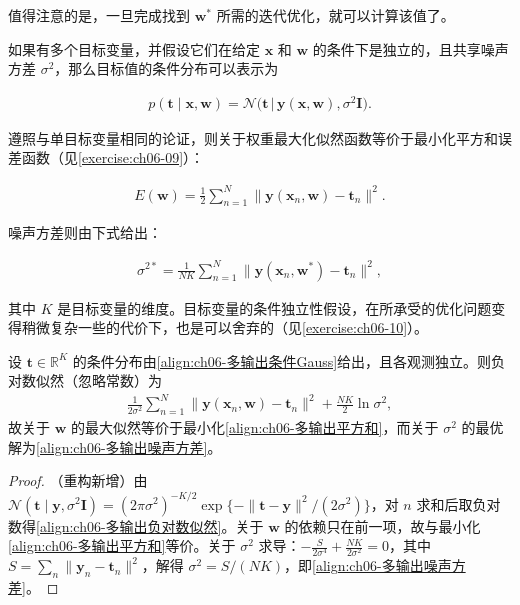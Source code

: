 \documentclass[../../main.tex]{subfiles}
\begin{document}
值得注意的是，一旦完成找到 $\boldsymbol{w}^{\ast}$ 所需的迭代优化，就可以计算该值了。

如果有多个目标变量，并假设它们在给定 $\boldsymbol{x}$ 和 $\boldsymbol{w}$ 的条件下是独立的，且共享噪声方差 $\sigma^{2}$，那么目标值的条件分布可以表示为

\begin{align}
p(\boldsymbol{t}\mid\boldsymbol{x},\boldsymbol{w})=\mathcal{N}\bigl(\boldsymbol{t}\,\big|\,\boldsymbol{y}(\boldsymbol{x},\boldsymbol{w}),\sigma^{2}\boldsymbol{I}\bigr).
\label{align:ch06-多输出条件Gauss}
\end{align}

遵照与单目标变量相同的论证，则关于权重最大化似然函数等价于最小化平方和误差函数（见\cref{exercise:ch06-09}）：

\begin{align}
E(\boldsymbol{w})=\frac{1}{2}\sum_{n=1}^{N}\bigl\|\boldsymbol{y}(\boldsymbol{x}_n,\boldsymbol{w})-\boldsymbol{t}_n\bigr\|^{2}.
\label{align:ch06-多输出平方和}
\end{align}

噪声方差则由下式给出：

\begin{align}
\sigma^{2\ast}=\frac{1}{NK}\sum_{n=1}^{N}\bigl\|\boldsymbol{y}(\boldsymbol{x}_n,\boldsymbol{w}^{\ast})-\boldsymbol{t}_n\bigr\|^{2},
\label{align:ch06-多输出噪声方差}
\end{align}

其中 $K$ 是目标变量的维度。目标变量的条件独立性假设，在所承受的优化问题变得稍微复杂一些的代价下，也是可以舍弃的（见\cref{exercise:ch06-10}）。

\begin{proposition}[多输出回归的误差函数与噪声方差]\label{proposition:ch06-多输出回归}
设 $\boldsymbol{t}\in\mathbb{R}^{K}$ 的条件分布由\eqref{align:ch06-多输出条件Gauss}给出，且各观测独立。则负对数似然（忽略常数）为
\begin{align}
\frac{1}{2\sigma^{2}}\sum_{n=1}^{N}\bigl\|\boldsymbol{y}(\boldsymbol{x}_n,\boldsymbol{w})-\boldsymbol{t}_n\bigr\|^{2}+\frac{NK}{2}\ln\sigma^{2},
\label{align:ch06-多输出负对数似然}
\end{align}
故关于 $\boldsymbol{w}$ 的最大似然等价于最小化\eqref{align:ch06-多输出平方和}，而关于 $\sigma^{2}$ 的最优解为\eqref{align:ch06-多输出噪声方差}。
\end{proposition}

\begin{proof}
（重构新增）由 $\mathcal{N}(\boldsymbol{t}\mid\boldsymbol{y},\sigma^{2}\boldsymbol{I})=(2\pi\sigma^{2})^{-K/2}\exp\{-\|\boldsymbol{t}-\boldsymbol{y}\|^{2}/(2\sigma^{2})\}$，对 $n$ 求和后取负对数得\eqref{align:ch06-多输出负对数似然}。关于 $\boldsymbol{w}$ 的依赖只在前一项，故与最小化\eqref{align:ch06-多输出平方和}等价。关于 $\sigma^{2}$ 求导：$-\frac{S}{2\sigma^{4}}+\frac{NK}{2\sigma^{2}}=0$，其中 $S=\sum_{n}\|\boldsymbol{y}_n-\boldsymbol{t}_n\|^{2}$，解得 $\sigma^{2}=S/(NK)$，即\eqref{align:ch06-多输出噪声方差}。
\end{proof}
\end{document}
